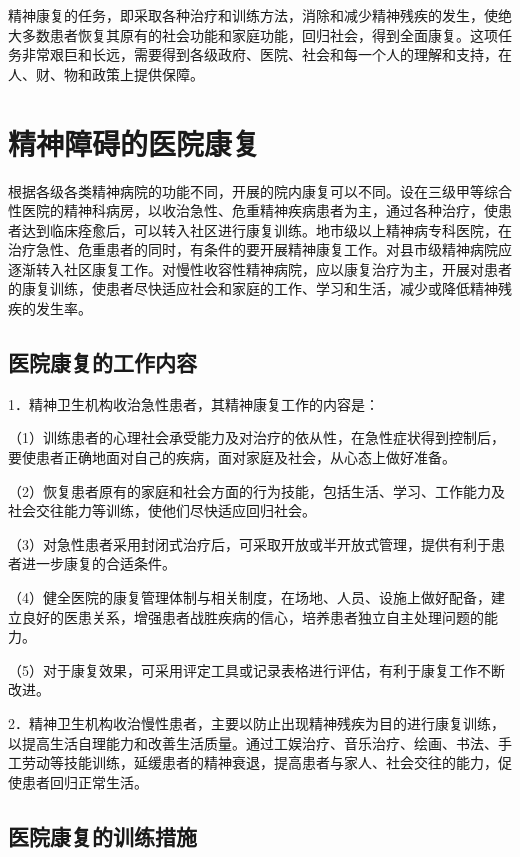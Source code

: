精神康复的任务，即采取各种治疗和训练方法，消除和减少精神残疾的发生，使绝大多数患者恢复其原有的社会功能和家庭功能，回归社会，得到全面康复。这项任务非常艰巨和长远，需要得到各级政府、医院、社会和每一个人的理解和支持，在人、财、物和政策上提供保障。

\section{精神障碍的医院康复}

根据各级各类精神病院的功能不同，开展的院内康复可以不同。设在三级甲等综合性医院的精神科病房，以收治急性、危重精神疾病患者为主，通过各种治疗，使患者达到临床痊愈后，可以转入社区进行康复训练。地市级以上精神病专科医院，在治疗急性、危重患者的同时，有条件的要开展精神康复工作。对县市级精神病院应逐渐转入社区康复工作。对慢性收容性精神病院，应以康复治疗为主，开展对患者的康复训练，使患者尽快适应社会和家庭的工作、学习和生活，减少或降低精神残疾的发生率。

\subsection{医院康复的工作内容}

1．精神卫生机构收治急性患者，其精神康复工作的内容是：

（1）训练患者的心理社会承受能力及对治疗的依从性，在急性症状得到控制后，要使患者正确地面对自己的疾病，面对家庭及社会，从心态上做好准备。

（2）恢复患者原有的家庭和社会方面的行为技能，包括生活、学习、工作能力及社会交往能力等训练，使他们尽快适应回归社会。

（3）对急性患者采用封闭式治疗后，可采取开放或半开放式管理，提供有利于患者进一步康复的合适条件。

（4）健全医院的康复管理体制与相关制度，在场地、人员、设施上做好配备，建立良好的医患关系，增强患者战胜疾病的信心，培养患者独立自主处理问题的能力。

（5）对于康复效果，可采用评定工具或记录表格进行评估，有利于康复工作不断改进。

2．精神卫生机构收治慢性患者，主要以防止出现精神残疾为目的进行康复训练，以提高生活自理能力和改善生活质量。通过工娱治疗、音乐治疗、绘画、书法、手工劳动等技能训练，延缓患者的精神衰退，提高患者与家人、社会交往的能力，促使患者回归正常生活。

\subsection{医院康复的训练措施}

